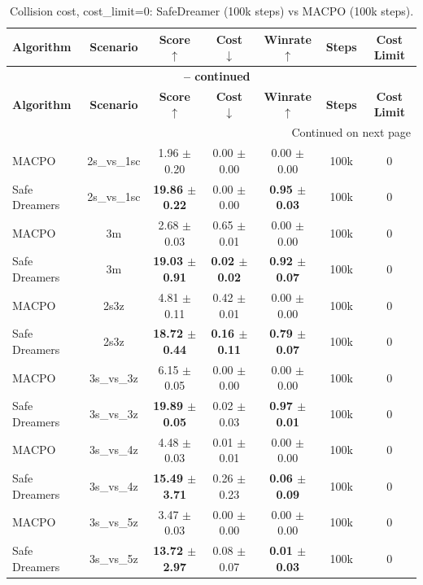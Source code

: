 \documentclass{article}
\begin{document}
\begin{longtable}{lcccccc}
\caption{Collision cost, cost\_limit=0: SafeDreamer (100k steps) vs MACPO (100k steps).}\\
\toprule
\textbf{Algorithm} & \textbf{Scenario} & \textbf{Score} $\uparrow$ & \textbf{Cost} $\downarrow$ & \textbf{Winrate} $\uparrow$ & \textbf{Steps} & \textbf{Cost Limit} \\
\midrule
\endfirsthead
\multicolumn{7}{c}{{\bfseries \tablename\ \thetable{} -- continued}} \\
\toprule
\textbf{Algorithm} & \textbf{Scenario} & \textbf{Score} $\uparrow$ & \textbf{Cost} $\downarrow$ & \textbf{Winrate} $\uparrow$ & \textbf{Steps} & \textbf{Cost Limit} \\
\midrule
\endhead
\midrule \multicolumn{7}{r}{{Continued on next page}} \\
\endfoot
\bottomrule
\endlastfoot
MACPO & 2s\_vs\_1sc & 1.96 $\pm$ 0.20 & 0.00 $\pm$ 0.00 & 0.00 $\pm$ 0.00 & 100k & 0 \\
Safe Dreamers & 2s\_vs\_1sc & \textbf{19.86 $\pm$ 0.22} & 0.00 $\pm$ 0.00 & \textbf{0.95 $\pm$ 0.03} & 100k & 0 \\
\midrule
MACPO & 3m & 2.68 $\pm$ 0.03 & 0.65 $\pm$ 0.01 & 0.00 $\pm$ 0.00 & 100k & 0 \\
Safe Dreamers & 3m & \textbf{19.03 $\pm$ 0.91} & \textbf{0.02 $\pm$ 0.02} & \textbf{0.92 $\pm$ 0.07} & 100k & 0 \\
\midrule
MACPO & 2s3z & 4.81 $\pm$ 0.11 & 0.42 $\pm$ 0.01 & 0.00 $\pm$ 0.00 & 100k & 0 \\
Safe Dreamers & 2s3z & \textbf{18.72 $\pm$ 0.44} & \textbf{0.16 $\pm$ 0.11} & \textbf{0.79 $\pm$ 0.07} & 100k & 0 \\
\midrule
MACPO & 3s\_vs\_3z & 6.15 $\pm$ 0.05 & 0.00 $\pm$ 0.00 & 0.00 $\pm$ 0.00 & 100k & 0 \\
Safe Dreamers & 3s\_vs\_3z & \textbf{19.89 $\pm$ 0.05} & 0.02 $\pm$ 0.03 & \textbf{0.97 $\pm$ 0.01} & 100k & 0 \\
\midrule
MACPO & 3s\_vs\_4z & 4.48 $\pm$ 0.03 & 0.01 $\pm$ 0.01 & 0.00 $\pm$ 0.00 & 100k & 0 \\
Safe Dreamers & 3s\_vs\_4z & \textbf{15.49 $\pm$ 3.71} & 0.26 $\pm$ 0.23 & \textbf{0.06 $\pm$ 0.09} & 100k & 0 \\
\midrule
MACPO & 3s\_vs\_5z & 3.47 $\pm$ 0.03 & 0.00 $\pm$ 0.00 & 0.00 $\pm$ 0.00 & 100k & 0 \\
Safe Dreamers & 3s\_vs\_5z & \textbf{13.72 $\pm$ 2.97} & 0.08 $\pm$ 0.07 & \textbf{0.01 $\pm$ 0.03} & 100k & 0 \\

\end{longtable}
\end{document}
